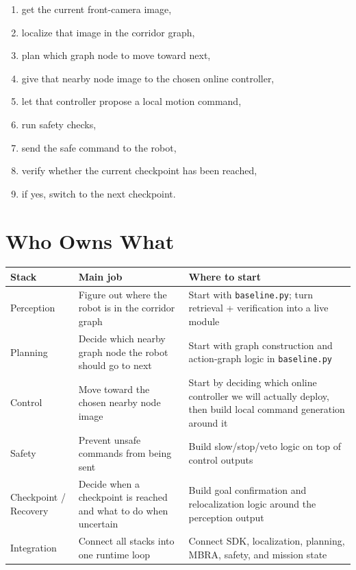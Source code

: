 \documentclass[11pt,a4paper]{article}
\begin{document}
\begin{enumerate}[nosep]
  \item get the current front-camera image,
  \item localize that image in the corridor graph,
  \item plan which graph node to move toward next,
  \item give that nearby node image to the chosen online controller,
  \item let that controller propose a local motion command,
  \item run safety checks,
  \item send the safe command to the robot,
  \item verify whether the current checkpoint has been reached,
  \item if yes, switch to the next checkpoint.
\end{enumerate}


\section{Who Owns What}

\begin{tabularx}{\textwidth}{p{} p{} X}
\toprule
\textbf{Stack} & \textbf{Main job} & \textbf{Where to start} \\
\midrule
Perception & Figure out where the robot is in the corridor graph & Start with \texttt{baseline.py}; turn retrieval + verification into a live module \\
Planning & Decide which nearby graph node the robot should go to next & Start with graph construction and action-graph logic in \texttt{baseline.py} \\
Control & Move toward the chosen nearby node image & Start by deciding which online controller we will actually deploy, then build local command generation around it \\
Safety & Prevent unsafe commands from being sent & Build slow/stop/veto logic on top of control outputs \\
Checkpoint / Recovery & Decide when a checkpoint is reached and what to do when uncertain & Build goal confirmation and relocalization logic around the perception output \\
Integration & Connect all stacks into one runtime loop & Connect SDK, localization, planning, MBRA, safety, and mission state \\
\bottomrule
\end{tabularx}
\end{document}

